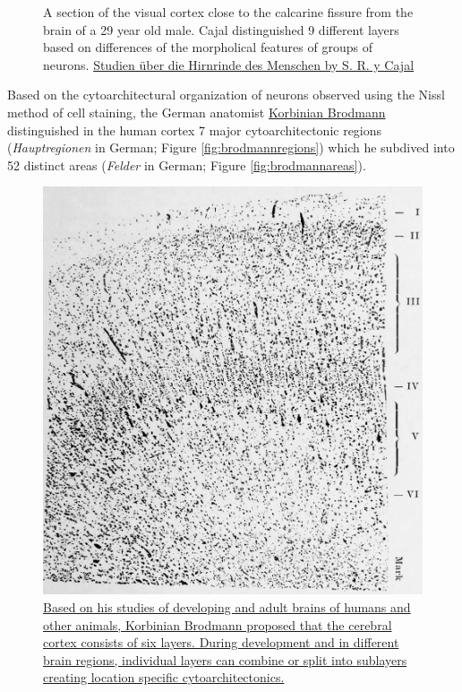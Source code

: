 \begin{figure}
{}

\caption{A section of the visual cortex close to the calcarine fissure from the brain of a 29 year old male. Cajal distinguished 9 different layers based on differences of the morpholical features of groups of neurons. \href{https://wellcomelibrary.org/item/b28084585}{Studien über die Hirnrinde des Menschen by S. R. y Cajal}}\label{fig:cajallayers}
\end{figure}

Based on the cytoarchitectural organization of neurons observed using the Nissl method of cell staining, the German anatomist \href{https://en.wikipedia.org/wiki/Korbinian_Brodmann}{Korbinian Brodmann} distinguished in the human cortex 7 major cytoarchitectonic regions (\emph{Hauptregionen} in German; Figure \ref{fig:brodmannregions}) which he subdived into 52 distinct areas (\emph{Felder} in German; Figure \ref{fig:brodmannareas}).



\begin{figure}

{\centering \includegraphics[width=0.7\linewidth]{./figures/cns/cortex_area_5} 

}

\caption{\href{https://wellcomelibrary.org/item/b28062449}{Based on his studies of developing and adult brains of humans and other animals, Korbinian Brodmann proposed that the cerebral cortex consists of six layers. During development and in different brain regions, individual layers can combine or split into sublayers creating location specific cytoarchitectonics.}}\label{fig:brodmannlayers}
\end{figure}



